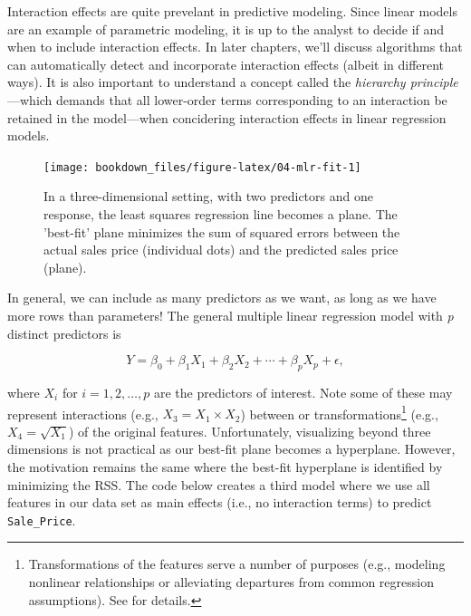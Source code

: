 \documentclass[]{krantz}
\makeatletter
\newenvironment{kframe}{%
\medskip{}
\setlength{\fboxsep}{.8em}
 \def\at@end@of@kframe{}%
 \ifinner\ifhmode%
  \def\at@end@of@kframe{\end{minipage}}%
  \begin{minipage}{\columnwidth}%
 \fi\fi%
 \def\FrameCommand##1{\hskip\@totalleftmargin \hskip-\fboxsep
 \colorbox{shadecolor}{##1}\hskip-\fboxsep
     \hskip-\linewidth \hskip-\@totalleftmargin \hskip\columnwidth}%
 \MakeFramed {\advance\hsize-\width
   \@totalleftmargin\z@ \linewidth\hsize
   \@setminipage}}%
 {\par\unskip\endMakeFramed%
 \at@end@of@kframe}
\newenvironment{block}[1]
  {
  \begin{itemize}
  \renewcommand{\labelitemi}{
    \raisebox{-.7\height}[0pt][0pt]{
      {\setkeys{Gin}{width=3em,keepaspectratio}\texttt{[image: icons/\#1]}}
    }
  }
  \setlength{\fboxsep}{1em}
  \begin{kframe}
  \item
  }
  {
  \end{kframe}
  \end{itemize}
  }
\newenvironment{note}
  {\begin{block}{note}}
  {\end{block}}
\makeatother
\begin{document}
\begin{note}
Interaction effects are quite prevelant in predictive modeling. Since
linear models are an example of parametric modeling, it is up to the
analyst to decide if and when to include interaction effects. In later
chapters, we'll discuss algorithms that can automatically detect and
incorporate interaction effects (albeit in different ways). It is also
important to understand a concept called the \emph{hierarchy
principle}---which demands that all lower-order terms corresponding to
an interaction be retained in the model---when concidering interaction
effects in linear regression models.
\end{note}

\begin{figure}

{\centering \texttt{[image: bookdown\_files/figure-latex/04-mlr-fit-1]} 

}

\caption{In a three-dimensional setting, with two predictors and one response, the least squares regression line becomes a plane. The 'best-fit' plane minimizes the sum of squared errors between the actual sales price (individual dots) and the predicted sales price (plane).}\label{fig:04-mlr-fit}
\end{figure}

In general, we can include as many predictors as we want, as long as we have more rows than parameters! The general multiple linear regression model with \emph{p} distinct predictors is

\begin{equation}
  Y = \beta_0 + \beta_1 X_1 + \beta_2 X_2 + \cdots + \beta_p X_p + \epsilon,
\end{equation}

where \(X_i\) for \(i = 1, 2, \dots, p\) are the predictors of interest. Note some of these may represent interactions (e.g., \(X_3 = X_1 \times X_2\)) between or transformations\footnote{Transformations of the features serve a number of purposes (e.g., modeling nonlinear relationships or alleviating departures from common regression assumptions). See \citet{kutner-2005-applied} for details.} (e.g., \(X_4 = \sqrt{X_1}\)) of the original features. Unfortunately, visualizing beyond three dimensions is not practical as our best-fit plane becomes a hyperplane. However, the motivation remains the same where the best-fit hyperplane is identified by minimizing the RSS. The code below creates a third model where we use all features in our data set as main effects (i.e., no interaction terms) to predict \texttt{Sale\_Price}.
\end{document}
